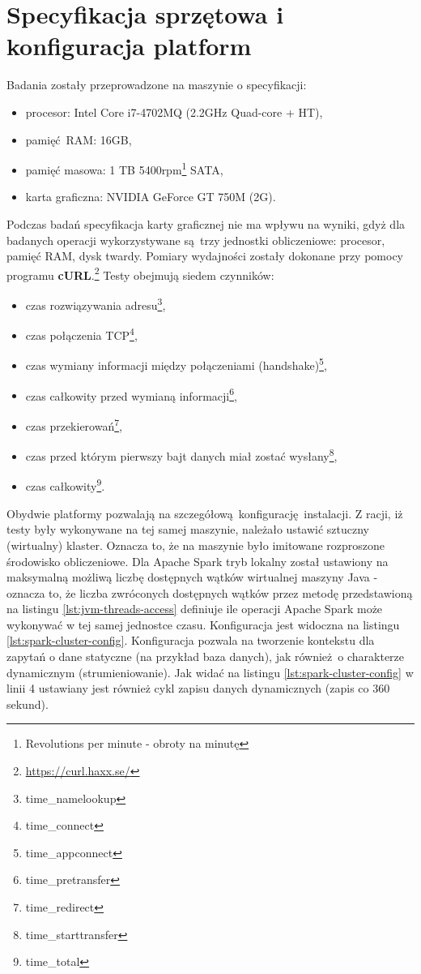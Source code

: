 \section{Specyfikacja sprzętowa i konfiguracja platform}
Badania zostały przeprowadzone na maszynie o specyfikacji:
\begin{itemize}
	\item procesor: Intel Core i7-4702MQ (2.2GHz Quad-core + HT), 
	\item pamięć RAM: 16GB,
	\item pamięć masowa: 1 TB 5400rpm\footnote{Revolutions per minute - obroty na minutę} SATA,
	\item karta graficzna: NVIDIA GeForce GT 750M (2G).  
\end{itemize}
Podczas badań specyfikacja karty graficznej nie ma wpływu na wyniki, gdyż dla badanych operacji wykorzystywane są trzy jednostki obliczeniowe: procesor, pamięć RAM, dysk twardy.
\newline Pomiary wydajności zostały dokonane przy pomocy programu \textbf{cURL}.\footnote{\url{https://curl.haxx.se/}} Testy obejmują siedem czynników:
\begin{itemize}\label{items:time-descriptions}
	\item{czas rozwiązywania adresu\footnote{time\_namelookup}},
	\item{czas połączenia TCP\footnote{time\_connect}},
	\item{czas wymiany informacji między połączeniami (handshake)\footnote{time\_appconnect}}, 
	\item{czas całkowity przed wymianą informacji\footnote{time\_pretransfer}},
	\item{czas przekierowań\footnote{time\_redirect}},
	\item{czas przed którym pierwszy bajt danych miał zostać wysłany\footnote{time\_starttransfer}},
	\item{czas całkowity\footnote{time\_total}}.
\end{itemize}
Obydwie platformy pozwalają na szczegółową konfigurację instalacji. Z racji, iż testy były wykonywane na tej samej maszynie, należało ustawić sztuczny (wirtualny) klaster. Oznacza to, że na maszynie było imitowane rozproszone środowisko obliczeniowe. Dla Apache Spark tryb lokalny został ustawiony na maksymalną możliwą liczbę dostępnych wątków wirtualnej maszyny Java - oznacza to, że liczba zwróconych dostępnych wątków przez metodę przedstawioną na listingu \ref{lst:jvm-threads-access} definiuje ile operacji Apache Spark może wykonywać w tej samej jednostce czasu. Konfiguracja jest widoczna na listingu \ref{lst:spark-cluster-config}. Konfiguracja pozwala na tworzenie kontekstu dla zapytań o dane statyczne (na przykład baza danych), jak również o charakterze dynamicznym (strumieniowanie). Jak widać na listingu \ref{lst:spark-cluster-config} w linii 4 ustawiany jest również cykl zapisu danych dynamicznych (zapis co 360 sekund).
